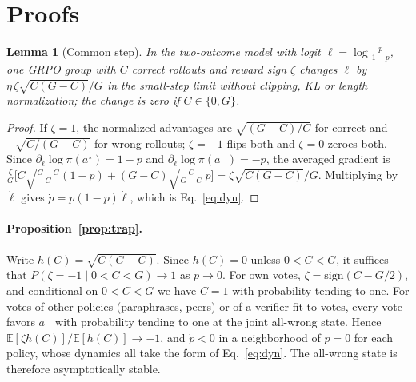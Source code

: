 \documentclass[11pt]{article}
\newtheorem{lemma}{Lemma}
\theoremstyle{remark}
\newcommand{\astar}{a^{\star}}
\newcommand{\aminus}{a^{-}}
\newcommand{\E}{\mathbb{E}}
\begin{document}
\section{Proofs}
\label{app:proofs}


\begin{lemma}[Common step]
\label{lem:common}
In the two-outcome model with logit $\ell=\log\frac{p}{1-p}$, one GRPO group with $C$ correct rollouts and reward sign $\zeta$ changes $\ell$ by $\eta\,\zeta\sqrt{C(G-C)}/G$ in the small-step limit without clipping, KL or length normalization; the change is zero if $C\in\{0,G\}$.
\end{lemma}
\begin{proof}
If $\zeta=1$, the normalized advantages are $\sqrt{(G-C)/C}$ for correct and $-\sqrt{C/(G-C)}$ for wrong rollouts; $\zeta=-1$ flips both and $\zeta=0$ zeroes both. Since $\partial_\ell\log\pi(\astar)=1-p$ and $\partial_\ell\log\pi(\aminus)=-p$, the averaged gradient is $\frac{\zeta}{G}\big[C\sqrt{\tfrac{G-C}{C}}(1-p)+(G-C)\sqrt{\tfrac{C}{G-C}}\,p\big]=\zeta\sqrt{C(G-C)}/G$. Multiplying by $\dot\ell$ gives $\dot p=p(1-p)\dot\ell$, which is Eq.~\eqref{eq:dyn}.
\end{proof}

\paragraph{Proposition~\ref{prop:trap}.}
Write $h(C)=\sqrt{C(G-C)}$. Since $h(C)=0$ unless $0<C<G$, it suffices that $P(\zeta=-1\mid 0<C<G)\to1$ as $p\to0$. For own votes, $\zeta=\mathrm{sign}(C-G/2)$, and conditional on $0<C<G$ we have $C=1$ with probability tending to one. For votes of other policies (paraphrases, peers) or of a verifier fit to votes, every vote favors $\aminus$ with probability tending to one at the joint all-wrong state. Hence $\E[\zeta h(C)]/\E[h(C)]\to-1$, and $\dot p<0$ in a neighborhood of $p=0$ for each policy, whose dynamics all take the form of Eq.~\eqref{eq:dyn}. The all-wrong state is therefore asymptotically stable.
\end{document}
